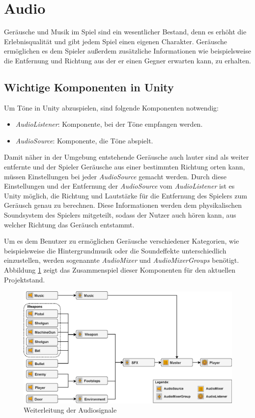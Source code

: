 \section{Audio} \label{audio}
Geräusche und Musik im Spiel sind ein wesentlicher Bestand, denn es erhöht die Erlebnisqualität und gibt jedem Spiel einen eigenen Charakter. Geräusche ermöglichen es dem Spieler außerdem zusätzliche Informationen wie beispielsweise die Entfernung und Richtung aus der er einen Gegner erwarten kann, zu erhalten. 

\subsection{Wichtige Komponenten in Unity}
Um Töne in Unity abzuspielen, sind folgende Komponenten notwendig:

\begin{itemize}
	\item \textit{AudioListener}: Komponente, bei der Töne empfangen werden.
	\item \textit{AudioSource}: Komponente, die Töne abspielt. 
\end{itemize}

Damit näher in der Umgebung entstehende Geräusche auch lauter sind als weiter entfernte und der Spieler Geräusche aus einer bestimmten Richtung orten kann, müssen Einstellungen bei jeder \textit{AudioSource} gemacht werden. Durch diese Einstellungen und der Entfernung der \textit{AudioSource} vom \textit{AudioListener} ist es Unity möglich, die Richtung und Lautstärke für die Entfernung des Spielers zum Geräusch genau zu berechnen. Diese Informationen werden dem physikalischen Soundsystem des Spielers mitgeteilt, sodass der Nutzer auch hören kann, aus welcher Richtung das Geräusch entstammt.

Um es dem Benutzer zu ermöglichen Geräusche verschiedener Kategorien, wie beispielsweise die Hintergrundmusik oder die Soundeffekte unterschiedlich einzustellen, werden sogenannte \textit{AudioMixer} und \textit{AudioMixerGroups} benötigt. Abbildung \ref{fig:audio_routing} zeigt das Zusammenspiel dieser Komponenten für den aktuellen Projektstand.

\begin {figure}[h]
	\begin {center}
	    \includegraphics[width=1\textwidth]{pics/audio_routing.eps}
		\caption{Weiterleitung der Audiosignale}
		\label{fig:audio_routing}
	\end {center}
\end {figure}

